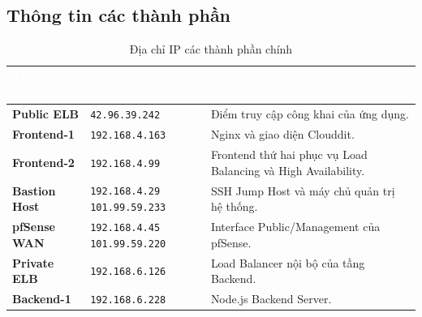 \documentclass[12pt, a4paper]{article}
\begin{document}
\subsection{Thông tin các thành phần}


\begin{table}[H]
    \centering
    \caption{Địa chỉ IP các thành phần chính}
    \label{tab:ip-address}

    \renewcommand{\arraystretch}{1.35}
    \setlength{\tabcolsep}{8pt}

    \begin{tabularx}{\textwidth}{
        >{\raggedright\arraybackslash}p{3.2cm}
        >{\centering\arraybackslash}p{4.2cm}
        >{\raggedright\arraybackslash}X
    }
        \toprule

        \rowcolor{CMCBlue}
        \textcolor{white}{\textbf{Thành phần}} &
        \textcolor{white}{\textbf{Địa chỉ IP}} &
        \textcolor{white}{\textbf{Chức năng}} \\

        \midrule

        \rowcolor{LightBlue}
        \textbf{Public ELB} &
        \texttt{42.96.39.242} &
        Điểm truy cập công khai của ứng dụng. \\

        \textbf{Frontend-1} &
        \texttt{192.168.4.163} &
        Nginx và giao diện Clouddit. \\

        \rowcolor{LightBlue}
        \textbf{Frontend-2} &
        \texttt{192.168.4.99} &
        Frontend thứ hai phục vụ Load Balancing và High Availability. \\

        \textbf{Bastion Host} &
        \texttt{192.168.4.29} \newline
        \texttt{101.99.59.233} &
        SSH Jump Host và máy chủ quản trị hệ thống. \\

        \rowcolor{LightBlue}
        \textbf{pfSense WAN} &
        \texttt{192.168.4.45} \newline
        \texttt{101.99.59.220} &
        Interface Public/Management của pfSense. \\

        \textbf{Private ELB} &
        \texttt{192.168.6.126} &
        Load Balancer nội bộ của tầng Backend. \\

        \rowcolor{LightBlue}
        \textbf{Backend-1} &
        \texttt{192.168.6.228} &
        Node.js Backend Server. \\


\end{tabularx}
\end{table}
\end{document}
